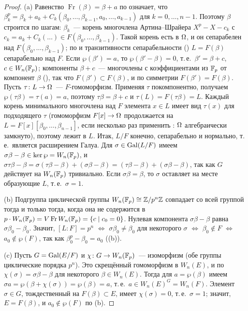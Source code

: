 \begin{proof}
(a) Равенство $\operatorname{Fr}(\beta)=\beta+a$ по  означает, что $\beta_k^p=\beta_k+a_k+C_k(\beta_0,\dots,\beta_{k-1},a_0,\dots,a_{k-1})$
для $k=0,\dots,n-1$. Поэтому $\beta$ строится по шагам: $\beta_k$~--- корень многочлена Артина--Шрайера $X^p-X-c_k$ с
$c_k=a_k+C_k(\dots)\in F(\beta_0,\dots,\beta_{k-1})$. Такой корень есть в $\Omega$, и он сепарабелен над
$F(\beta_0,\dots,\beta_{k-1})$; по  и транзитивности сепарабельности () $L=F(\beta)$ сепарабельно над $F$. Если
$\wp(\beta')=a$, то $\wp(\beta'-\beta)=0$, т.\,е.\ $\beta'=\beta+c$, $c\in W_n(\mathbb F_p)$; компоненты $\beta+c$~--- многочлены с
коэффициентами из $\mathbb F_p$ от компонент $\beta$ (), так что $F(\beta')\subset F(\beta)$, и по симметрии $F(\beta')=F(\beta)$.
Пусть $\tau\colon L\to\Omega$~--- $F$-гомоморфизм. Применяя $\tau$ покомпонентно, получаем $\wp(\tau\beta)=\tau(a)=a$, поэтому
$\tau\beta=\beta+c$ и $\tau(L)=F(\tau\beta)=L$. Каждый корень минимального многочлена над $F$ элемента $x\in L$ имеет вид
$\tau(x)$ для подходящего $\tau$ (гомоморфизм $F[x]\to\Omega$ продолжается на $L=F[x][\beta_0,\dots,\beta_{n-1}]$, если
несколько раз применить : $\Omega$ алгебраически замкнуто), поэтому лежит в $L$. Итак, $L/F$ конечно, сепарабельно и нормально, т.\,е.\ является расширением Галуа.
Для $\sigma\in\operatorname{Gal}(L/F)$ имеем $\sigma\beta-\beta\in\ker\wp=W_n(\mathbb F_p)$, и
$\sigma\tau\beta-\beta=\sigma(\tau\beta-\beta)+(\sigma\beta-\beta)=(\tau\beta-\beta)+(\sigma\beta-\beta)$, так как $G$ действует
на $W_n(\mathbb F_p)$ тривиально. Если $\sigma\beta=\beta$, то $\sigma$ оставляет на месте образующие $L$, т.\,е.\ $\sigma=1$.

(b) Подгруппа циклической группы $W_n(\mathbb F_p)\cong\mathbb Z/p^n\mathbb Z$ совпадает со всей группой тогда и только тогда, когда она не
содержится в $p\cdot W_n(\mathbb F_p)=V\operatorname{Fr}W_n(\mathbb F_p)=\{c\mid c_0=0\}$. Нулевая компонента $\sigma\beta-\beta$ равна
$\sigma\beta_0-\beta_0$. Значит, $[L:F]=p^n$ $\iff$ $\sigma\beta_0\ne\beta_0$ для некоторого $\sigma$ $\iff$ $\beta_0\notin F$
$\iff$ $a_0\notin\wp(F)$, так как $\beta_0^p-\beta_0=a_0$ ((b)).

(c) Пусть $G=\operatorname{Gal}(E/F)$ и $\chi\colon G\to W_n(\mathbb F_p)$~--- изоморфизм (обе группы циклические порядка $p^n$). Это скрещённый
гомоморфизм в $W_n(E)$, и по  $\chi(\sigma)=\sigma\beta-\beta$ для некоторого $\beta\in W_n(E)$. Тогда для
$a=\wp(\beta)$ имеем $\sigma a=\wp(\beta+\chi(\sigma))=\wp(\beta)=a$, т.\,е.\ $a\in W_n(E)^G=W_n(F)$. Элемент $\sigma\in G$,
тождественный на $F(\beta)\subset E$, имеет $\chi(\sigma)=0$, т.\,е.\ $\sigma=1$; значит, $E=F(\beta)$, и $a_0\notin\wp(F)$ по (b).
\end{proof}

